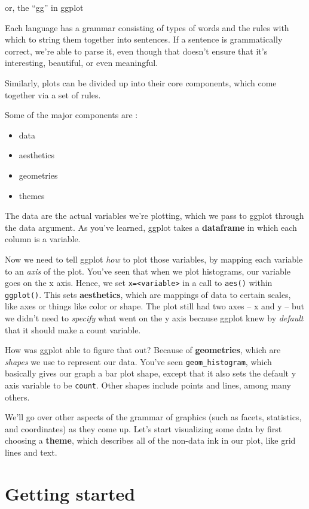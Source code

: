 \documentclass[
  12pt,
]{book}
\providecommand{\tightlist}{%
  \setlength{\itemsep}{0pt}\setlength{\parskip}{0pt}}
\begin{document}
or, the ``gg'' in ggplot

Each language has a grammar consisting of types of words and the rules with which to string them together into sentences. If a sentence is grammatically correct, we're able to parse it, even though that doesn't ensure that it's interesting, beautiful, or even meaningful.

Similarly, plots can be divided up into their core components, which come together via a set of rules.

Some of the major components are :

\begin{itemize}
\tightlist
\item
  data
\item
  aesthetics
\item
  geometries
\item
  themes
\end{itemize}

The data are the actual variables we're plotting, which we pass to ggplot through the data argument. As you've learned, ggplot takes a \textbf{dataframe} in which each column is a variable.

Now we need to tell ggplot \emph{how} to plot those variables, by mapping each variable to an \emph{axis} of the plot. You've seen that when we plot histograms, our variable goes on the x axis. Hence, we set \texttt{x=\textless{}variable\textgreater{}} in a call to \texttt{aes()} within \texttt{ggplot()}. This sets \textbf{aesthetics}, which are mappings of data to certain scales, like axes or things like color or shape. The plot still had two axes -- x and y -- but we didn't need to \emph{specify} what went on the y axis because ggplot knew by \emph{default} that it should make a count variable.

How was ggplot able to figure that out? Because of \textbf{geometries}, which are \emph{shapes} we use to represent our data. You've seen \texttt{geom\_histogram}, which basically gives our graph a bar plot shape, except that it also sets the default y axis variable to be \texttt{count}. Other shapes include points and lines, among many others.

We'll go over other aspects of the grammar of graphics (such as facets, statistics, and coordinates) as they come up. Let's start visualizing some data by first choosing a \textbf{theme}, which describes all of the non-data ink in our plot, like grid lines and text.

\hypertarget{getting-started}{%
\section{Getting started}\label{getting-started}}
\end{document}
